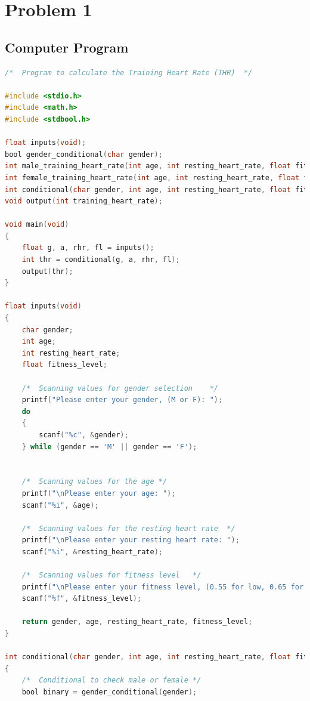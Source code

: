 {}

\section{{Problem 1}}

	\subsection{{Computer Program}}

		\begin{lstlisting}[language=C, caption=\textit{Hello World Program}]	
/*  Program to calculate the Training Heart Rate (THR)  */

#include <stdio.h>
#include <math.h>
#include <stdbool.h>

float inputs(void);
bool gender_conditional(char gender);
int male_training_heart_rate(int age, int resting_heart_rate, float fitness_level);
int female_training_heart_rate(int age, int resting_heart_rate, float fitness_level);
int conditional(char gender, int age, int resting_heart_rate, float fitness_level);
void output(int training_heart_rate);

void main(void)
{
    float g, a, rhr, fl = inputs();
    int thr = conditional(g, a, rhr, fl);
    output(thr);
}

float inputs(void)
{
    char gender;
    int age;
    int resting_heart_rate;
    float fitness_level;

    /*  Scanning values for gender selection    */
    printf("Please enter your gender, (M or F): ");
    do
    {
        scanf("%c", &gender);
    } while (gender == 'M' || gender == 'F');
    

    /*  Scanning values for the age */
    printf("\nPlease enter your age: ");
    scanf("%i", &age);

    /*  Scanning values for the resting heart rate  */
    printf("\nPlease enter your resting heart rate: ");
    scanf("%i", &resting_heart_rate);

    /*  Scanning values for fitness level   */
    printf("\nPlease enter your fitness level, (0.55 for low, 0.65 for medium, and 0.8 for high fitness): ");
    scanf("%f", &fitness_level);

    return gender, age, resting_heart_rate, fitness_level;
}

int conditional(char gender, int age, int resting_heart_rate, float fitness_level)
{
    /*  Conditional to check male or female */
    bool binary = gender_conditional(gender);


\end{lstlisting}
